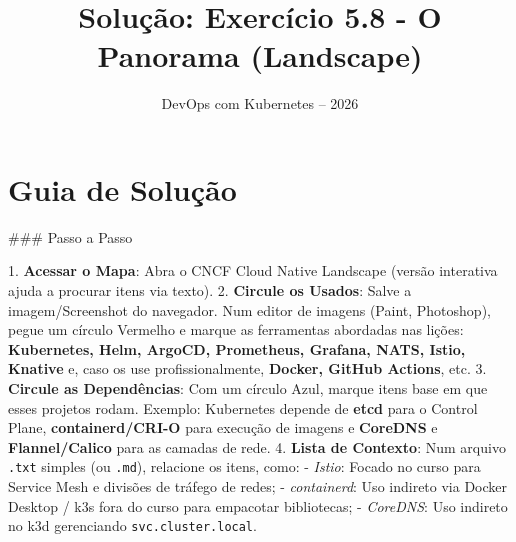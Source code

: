 \documentclass[11pt,a4paper]{article}
\title{\color{secondary}\Huge\textbf{Solução: Exercício 5.8 - O Panorama (Landscape)}}
\author{\color{primary}DevOps com Kubernetes -- 2026}
\date{}
\begin{document}
\maketitle

\section*{\color{primary}Guia de Solução}
\begin{tcolorbox}[colback=green!5!white,colframe=green!60!black,title=Resolução Passo a Passo]
### Passo a Passo

1. \textbf{Acessar o Mapa}: Abra o CNCF Cloud Native Landscape (versão interativa ajuda a procurar itens via texto).
2. \textbf{Circule os Usados}: Salve a imagem/Screenshot do navegador. Num editor de imagens (Paint, Photoshop), pegue um círculo Vermelho e marque as ferramentas abordadas nas lições: \textbf{Kubernetes, Helm, ArgoCD, Prometheus, Grafana, NATS, Istio, Knative} e, caso os use profissionalmente, \textbf{Docker, GitHub Actions}, etc.
3. \textbf{Circule as Dependências}: Com um círculo Azul, marque itens base em que esses projetos rodam. Exemplo: Kubernetes depende de \textbf{etcd} para o Control Plane, \textbf{containerd/CRI-O} para execução de imagens e \textbf{CoreDNS} e \textbf{Flannel/Calico} para as camadas de rede.
4. \textbf{Lista de Contexto}: Num arquivo \texttt{.txt} simples (ou \texttt{.md}), relacione os itens, como: 
   - \textit{Istio}: Focado no curso para Service Mesh e divisões de tráfego de redes;
   - \textit{containerd}: Uso indireto via Docker Desktop / k3s fora do curso para empacotar bibliotecas;
   - \textit{CoreDNS}: Uso indireto no k3d gerenciando \texttt{svc.cluster.local}.
\end{tcolorbox}
\end{document}
